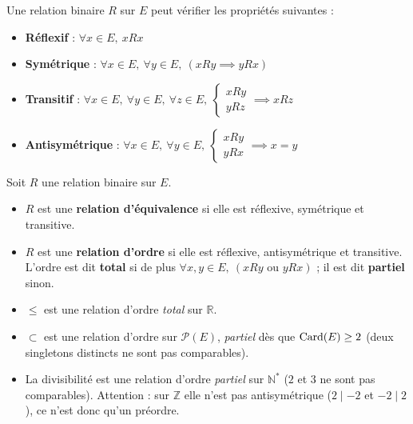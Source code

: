 Une relation binaire $R$ sur $E$ peut vérifier les propriétés suivantes :
\begin{itemize}
    \item \textbf{Réflexif} : $\forall x \in E,\ xRx$
    \item \textbf{Symétrique} : $\forall x \in E,\ \forall y \in E,\ (xRy \implies yRx)$
    \item \textbf{Transitif} : $\forall x \in E,\ \forall y \in E,\ \forall z \in E,\ \begin{cases} xRy \\ yRz \end{cases} \implies xRz$
    \item \textbf{Antisymétrique} : $\forall x \in E,\ \forall y \in E,\ \begin{cases} xRy \\ yRx \end{cases} \implies x = y$
\end{itemize}

\begin{defi}
Soit $R$ une relation binaire sur $E$.
\begin{itemize}
\item $R$ est une \textbf{relation d'équivalence} si elle est réflexive, symétrique et transitive.
\item $R$ est une \textbf{relation d'ordre} si elle est réflexive, antisymétrique et transitive. L'ordre est dit \textbf{total} si de plus $\forall x,y\in E,\ (xRy \text{ ou } yRx)$ ; il est dit \textbf{partiel} sinon.
\end{itemize}
\end{defi}

\begin{exemple}
\begin{itemize}
\item $\leq$ est une relation d'ordre \emph{total} sur $\mathbb{R}$.
\item $\subset$ est une relation d'ordre sur $\mathcal{P}(E)$, \emph{partiel} dès que $\operatorname{Card}(E)\geq 2$ (deux singletons distincts ne sont pas comparables).
\item La divisibilité est une relation d'ordre \emph{partiel} sur $\mathbb{N}^*$ ($2$ et $3$ ne sont pas comparables). Attention : sur $\mathbb{Z}$ elle n'est pas antisymétrique ($2\mid -2$ et $-2\mid 2$), ce n'est donc qu'un préordre.
\end{itemize}
\end{exemple}

